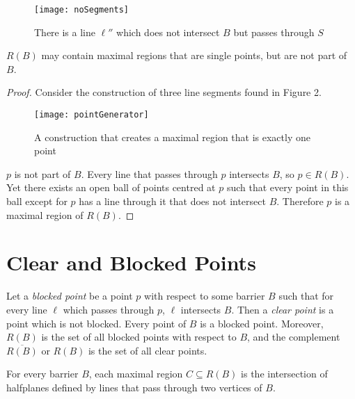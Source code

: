 \documentclass{cccg12}
\begin{document}
\begin{figure}[ht]
  \centering
  \texttt{[image: noSegments]}
  \caption{There is a line $\ell''$ which does not intersect $B$ but passes through $S$}
  \label{fig:noSegments}
\end{figure}

\begin{lemma}
\label{lemma:hasPoints}
$R(B)$ may contain maximal regions that are single points, but are not part of $B$.
\end{lemma}

\begin{proof}
Consider the construction of three line segments found in Figure 2. 

\begin{figure}[ht]
  \centering
  \texttt{[image: pointGenerator]}
  \caption{A construction that creates a maximal region that is exactly one point}
  \label{fig:pointGenerator}
\end{figure}

$p$ is not part of $B$. Every line that passes through $p$ intersects $B$, so $p \in R(B)$. Yet there exists an open ball of points centred at $p$ such that every point in this ball except for $p$ has a line through it that does not intersect $B$. Therefore $p$ is a maximal region of $R(B)$.\end{proof}



\section{Clear and Blocked Points}

Let a \emph{blocked point} be a point $p$ with respect to some barrier $B$ such that for every line $\ell$ which passes through $p$, $\ell$ intersects $B$. Then a \emph{clear point} is a point which is not blocked. Every point of $B$ is a blocked point. Moreover, $R(B)$ is the set of all blocked points with respect to $B$, and the complement $\overline{R(B)}$ or $R(B)$ is the set of all clear points. 

\begin{theorem}
\label{thm:tangency-boundary}
For every barrier $B$, each maximal region $C \subseteq R(B)$ is the intersection of halfplanes defined by lines that pass through two vertices of $B$.
\end{theorem}
\end{document}
